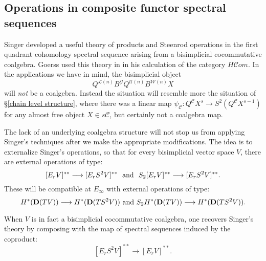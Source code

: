 \documentclass[11pt]{amsart} \renewcommand{\baselinestretch}{1.2}
\theoremstyle{plain}
\theoremstyle{definition}
\renewcommand{\to}{\longrightarrow}
\newcommand{\scrG}{\mathscr{G}}
\newcommand{\scrC}{\mathscr{C}}
\newcommand{\calU}{\mathcal{U}}
\newcommand{\calL}{\mathcal{L}}
\newcommand{\calw}{\mathcal{W}}
\newcommand{\calc}{\mathcal{C}}
\newcommand{\BSW}{{\scrG}}
\newcommand{\BSWres}{B^\BSW}%
\newcommand{\HA}[1]{H#1}
\newcommand{\algs}{{\scrC\!\textit{om}}}
\newcommand{\Edown}[4]{[E_{#1}#2]^{#3}_{#4}}
\newcommand{\dual}{\mathbf{D}}
\begin{document}
\begin{Operations in composite functor spectral sequences}
\section{\textbf{Operations in composite functor spectral sequences}}
\label{Operations in composite functor spectral sequences}
Singer \cite{MR2245560} developed a useful theory of products and Steenrod operations in the first quadrant cohomology spectral sequence arising from a bisimplicial cocommutative coalgebra. Goerss used this theory in \cite[\S14]{MR1089001} in his calculation of the category $\HA{\algs}$.
 In the applications we have in mind, the bisimplicial object \[Q^{\calL(n)}\BSWres Q^{\calU(n)}{ B^{\calw(n)}X}\] 
will \emph{not} be a coalgebra. Instead the situation will resemble more the situation of \S\ref{chain level structure}, where there was a linear map $\psi_\calc:Q^{\calc}X^s\to S^2(Q^{\calc}X^{s-1})$ for any almost free object $X\in s\calc$, but certainly not a coalgebra map.


The lack of an underlying coalgebra structure will not stop us from applying Singer's techniques after we make the appropriate modifications. The idea is to externalize Singer's operations, so that for every bisimplicial vector space $V$, there are  external operations of type:
\[\Edown{r}{V}{**}{}\to \Edown{r}{S^2V}{**}{}\textup{ \ and \ }S_2\Edown{r}{V}{**}{}\to \Edown{r}{S^2V}{**}{}.\]
These will be compatible at $E_\infty$ with external operations of type:
\[H^*(\dual(TV))\to H^*(\dual(TS^2V))\textup{ and }S_2H^*(\dual(TV))\to H^*(\dual(TS^2V)).\]


When $V$ is  in fact a bisimplicial cocommutative coalgebra, one recovers Singer's theory by composing with the map of spectral sequences induced by the coproduct:
\[\Edown{r}{S^2V}{**}{}\to \Edown{r}{V}{**}{}.\]

\end{Operations in composite functor spectral sequences}
\end{document}
